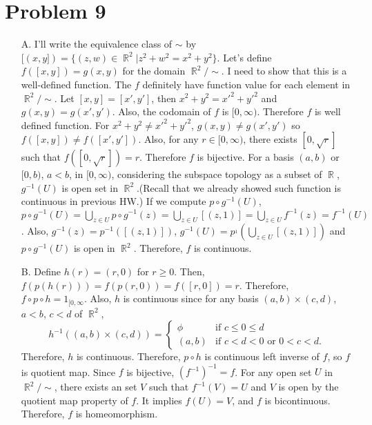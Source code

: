 \documentclass{article}
\DeclareMathOperator{\rr}{\mathbb{R}}
\begin{document}
\section*{Problem 9}
\begin{enumerate}
\item[A.] I'll write the equivalence class of $\sim$ by $[(x,y])=\{(z,w)\in \rr^2|z^2+w^2=x^2+y^2\}$. Let's define $f([x,y])=g(x,y)$ for the domain $\rr^2/\sim$. I need to show that this is a well-defined function. The $f$ definitely have function value for each element in $\rr^2/\sim$. Let $[x,y]=[x',y']$, then $x^2+y^2=x'^2+y'^2$ and $g(x,y)=g(x', y')$. Also, the codomain of $f$ is $[0,\infty)$. Therefore $f$ is well defined function. For $x^2+y^2\neq x'^2+y'^2$, $g(x,y)\neq g(x', y')$ so $f([x,y])\neq f([x',y'])$. Also, for any $r\in [0, \infty)$, there exists $[0, \sqrt{r}]$ such that $f([0, \sqrt{r}])=r$. Therefore $f$ is bijective. For a basis $(a,b)$ or $[0, b)$, $a<b$, in $[0, \infty)$, considering the subspace topology as a subset of $\rr$, $g^{-1}(U)$ is open set in $\rr^2$.(Recall that we already showed such function is continuous in previous HW.) If we compute $p\circ g^{-1}(U)$, $p\circ g^{-1}(U)=\bigcup_{z\in U}p\circ g^{-1}(z)=\bigcup_{z\in U}[(z,1)]=\bigcup_{z\in U} f^{-1}(z)=f^{-1}(U)$. Also, $g^{-1}(z)=p^{-1}([(z,1)])$, $g^{-1}(U)=p^{_1}\left(\bigcup_{z\in U} [(z,1)]\right)$ and $p\circ g^{-1}(U)$ is open in $\rr^2$. Therefore, $f$ is continuous.

\item[B.] Define $h(r)=(r, 0)$ for $r\geq 0$. Then, $f(p(h(r)))=f(p(r, 0))=f([r,0])=r$. Therefore, $f\circ p \circ h=1_{[0,\infty}$. Also, $h$ is continuous since for any basis $(a,b)\times (c,d)$, $a<b$, $c<d$ of $\rr^2$,
\begin{equation*}
h^{-1}\left((a,b)\times (c,d)\right)=\begin{cases}
\phi & \text{if }c\leq 0\leq d \\
(a,b) & \text{if } c<d<0 \text{ or }0<c<d.
\end{cases}
\end{equation*}
Therefore, $h$ is continuous. Therefore, $p\circ h$ is continuous left inverse of $f$, so $f$ is quotient map. Since $f$ is bijective, $\left(f^{-1}\right)^{-1}=f$. For any open set $U$ in $\rr^2/\sim$, there exists an set $V$ such that $f^{-1}(V)=U$ and $V$ is open by the quotient map property of $f$. It implies $f(U)=V$, and $f$ is bicontinuous. Therefore, $f$ is homeomorphism.
\end{enumerate}
\end{document}
